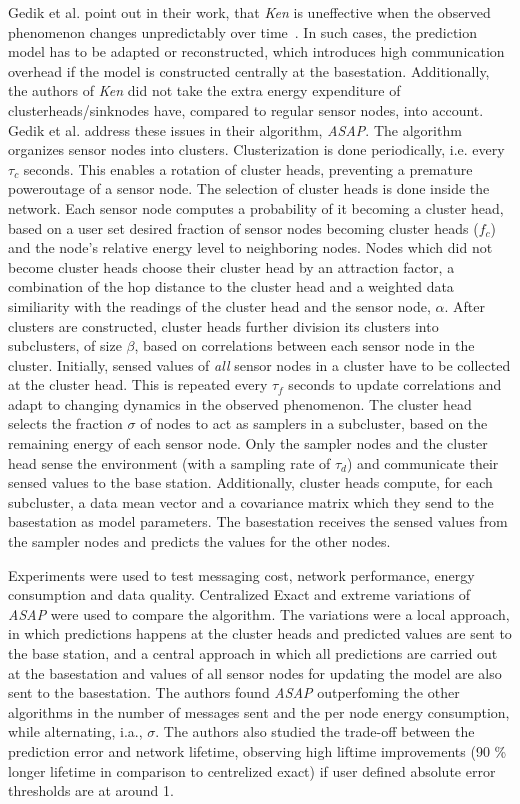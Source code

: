 \par
Gedik et al. point out in their work, that \textit{Ken} is uneffective when the
observed phenomenon changes unpredictably over time~\cite{gedik2007asap}. In
such cases, the prediction model has to be adapted or reconstructed, which
introduces high communication overhead if the model is constructed centrally at
the basestation. Additionally, the authors of \textit{Ken} did not take the
extra energy expenditure of clusterheads/sinknodes have, compared to regular
sensor nodes, into account. Gedik et al. address these issues in their
algorithm, \textit{ASAP}. The algorithm organizes sensor nodes into clusters.
Clusterization is done periodically, i.e. every $ \tau_c $ seconds. This
enables a rotation of cluster heads, preventing a premature poweroutage of a
sensor node. The selection of cluster heads is done inside the network. Each
sensor node computes a probability of it becoming a cluster head, based on a
user set desired fraction of sensor nodes becoming cluster heads ($ f_c $) and
the node's relative energy level to neighboring nodes. Nodes which did not
become cluster heads choose their cluster head by an attraction factor, a
combination of the hop distance to the cluster head and a weighted data
similiarity with the readings of the cluster head and the sensor node, $ \alpha
$. After clusters are constructed, cluster heads further division its clusters
into subclusters, of size $ \beta $, based on correlations between each sensor
node in the cluster. Initially, sensed values of \textit{all} sensor nodes in a
cluster have to be collected at the cluster head. This is repeated every $
\tau_f $ seconds to update correlations and adapt to changing dynamics in the
observed phenomenon. The cluster head selects the fraction $ \sigma $ of nodes
to act as samplers in a subcluster, based on the remaining energy of each
sensor node. Only the sampler nodes and the cluster head sense the environment
(with a sampling rate of $ \tau_d $) and communicate their sensed values to the
base station. Additionally, cluster heads compute, for each subcluster, a data
mean vector and a covariance matrix which they send to the basestation as model
parameters. The basestation receives the sensed values from the sampler nodes
and predicts the values for the other nodes.

Experiments were used to test messaging cost, network performance, energy
consumption and data quality. Centralized Exact and extreme variations of
\textit{ASAP} were used to compare the algorithm. The variations were a local
approach, in which predictions happens at the cluster heads and predicted
values are sent to the base station, and a central approach in which all
predictions are carried out at the basestation and values of all sensor nodes
for updating the model are also sent to the basestation. The authors found
\textit{ASAP} outperfoming the other algorithms in the number of messages sent
and the per node energy consumption, while alternating, i.a., $ \sigma $. The
authors also studied the trade-off between the prediction error and network
lifetime, observing high liftime improvements (90 \% longer lifetime in
comparison to centrelized exact) if user defined absolute error thresholds are
at around 1.

